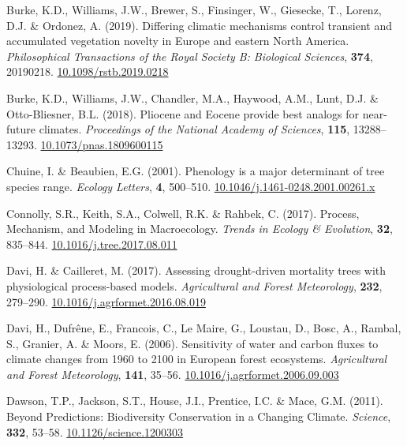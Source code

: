 \documentclass[11pt,]{article}
\newlength{\cslhangindent}
\newenvironment{CSLReferences}[2] %
 {%
  \setlength{\parindent}{0pt}
  \ifodd #1 \everypar{\setlength{\hangindent}{\cslhangindent}}\ignorespaces\fi
  \ifnum #2 > 0
  \setlength{\parskip}{#2\baselineskip}
  \fi
 }%
 {}
\begin{document}
\begin{CSLReferences}{1}{0}
\leavevmode{}%
Burke, K.D., Williams, J.W., Brewer, S., Finsinger, W., Giesecke, T.,
Lorenz, D.J. \& Ordonez, A. (2019). Differing climatic mechanisms
control transient and accumulated vegetation novelty in {Europe} and
eastern {North} {America}. \emph{Philosophical Transactions of the Royal
Society B: Biological Sciences}, \textbf{374}, 20190218.
\href{https://doi.org/10.1098/rstb.2019.0218}{10.1098/rstb.2019.0218}

\leavevmode{}%
Burke, K.D., Williams, J.W., Chandler, M.A., Haywood, A.M., Lunt, D.J.
\& Otto-Bliesner, B.L. (2018). Pliocene and {Eocene} provide best
analogs for near-future climates. \emph{Proceedings of the National
Academy of Sciences}, \textbf{115}, 13288--13293.
\href{https://doi.org/10.1073/pnas.1809600115}{10.1073/pnas.1809600115}

\leavevmode{}%
Chuine, I. \& Beaubien, E.G. (2001). Phenology is a major determinant of
tree species range. \emph{Ecology Letters}, \textbf{4}, 500--510.
\href{https://doi.org/10.1046/j.1461-0248.2001.00261.x}{10.1046/j.1461-0248.2001.00261.x}

\leavevmode{}%
Connolly, S.R., Keith, S.A., Colwell, R.K. \& Rahbek, C. (2017).
Process, {Mechanism}, and {Modeling} in {Macroecology}. \emph{Trends in
Ecology \& Evolution}, \textbf{32}, 835--844.
\href{https://doi.org/10.1016/j.tree.2017.08.011}{10.1016/j.tree.2017.08.011}

\leavevmode{}%
Davi, H. \& Cailleret, M. (2017). Assessing drought-driven mortality
trees with physiological process-based models. \emph{Agricultural and
Forest Meteorology}, \textbf{232}, 279--290.
\href{https://doi.org/10.1016/j.agrformet.2016.08.019}{10.1016/j.agrformet.2016.08.019}

\leavevmode{}%
Davi, H., Dufrêne, E., Francois, C., Le Maire, G., Loustau, D., Bosc,
A., Rambal, S., Granier, A. \& Moors, E. (2006). Sensitivity of water
and carbon fluxes to climate changes from 1960 to 2100 in {European}
forest ecosystems. \emph{Agricultural and Forest Meteorology},
\textbf{141}, 35--56.
\href{https://doi.org/10.1016/j.agrformet.2006.09.003}{10.1016/j.agrformet.2006.09.003}

\leavevmode{}%
Dawson, T.P., Jackson, S.T., House, J.I., Prentice, I.C. \& Mace, G.M.
(2011). Beyond {Predictions}: {Biodiversity} {Conservation} in a
{Changing} {Climate}. \emph{Science}, \textbf{332}, 53--58.
\href{https://doi.org/10.1126/science.1200303}{10.1126/science.1200303}


\end{CSLReferences}
\end{document}
